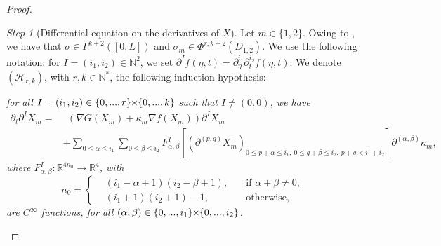 \documentclass{article}
\newcommand{\DI}{\partial^I}
\newcommand{\PLH}{{\mkern-1mu\times\mkern-1mu}}
\newcommand{\Times}{\PLH}
\newcommand{\R}{\mathbb{R}}
\newcommand{\EN}{\mathbb{N}}
\newcommand{\ko}{\kappa}
\renewcommand{\H}{\mathcal{H}}
\theoremstyle{remark}
\theoremstyle{prpart}
\newtheorem{proofpart}{Step}
\renewcommand{\H}{\mathcal{H}}
\begin{document}
\begin{proof}
\begin{proofpart}[Differential equation on the derivatives of $X$]\label{step:diff-eq}
Let $m\in\{1,2\}$. Owing to \cite[Chap. V, Th. 4.1]{Har64}, we have that $\sigma\in \Gamma^{k+2}([0,L])$ and $\sigma_m\in \Phi^{r,k+2}(D_{1,2})$.
We use the following notation: for $I=(i_1,i_2)\in \EN^2$, we set $\DI f(\eta,t) = \partial_\eta^{i_1}\partial^{i_2}_t f(\eta,t)$. 
We denote $(\H_{r,k})$, with $r,k\in\EN^\ast$, the following induction hypothesis:

\textit{for all $I=(i_1,i_2)\in\{0,...,r\}\Times\{0,...,k\}$ such that $I\neq (0,0)$, we have
\begin{equation}\label{eq:eq-der-courbe}
\begin{split}
\partial_t \DI X_m = &~~(\nabla G(X_m)+\ko_m\nabla f(X_m))\DI X_m \\
&+ \sum_{0\leq\alpha\leq i_1}\sum_{0\leq\beta\leq i_2}F^I_{\alpha,\beta}\left[(\partial^{(p,q)}X_m)_{0\leq p+\alpha \leq i_1,~0\leq q+\beta\leq i_2,~p+q<i_1+i_2}\right] \partial^{(\alpha,\beta)}\ko_m,
\end{split}
\end{equation}
where $F^I_{\alpha,\beta}:\R^{4n_0}\to \R^4$, with
\begin{equation*}
 n_0=\left\{\begin{split}
 &(i_1-\alpha+1)(i_2-\beta+1), &\quad\text{if } \alpha+\beta\neq0,\\
  &(i_1+1)(i_2+1)-1, &\quad\text{otherwise},
\end{split}\right.
\end{equation*}
are $C^\infty$ functions, for all $(\alpha,\beta)\in\{0,...,i_1\}\Times\{0,...,i_2\}$. %
}


\end{proofpart}
\end{proof}
\end{document}
